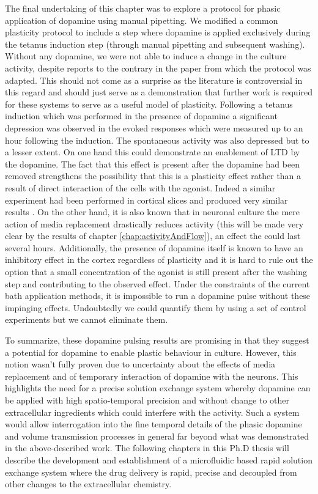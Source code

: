     The final undertaking of this chapter was to explore a protocol for phasic application of dopamine using manual pipetting. We modified a common plasticity protocol to include a step where dopamine is applied exclusively during the tetanus induction step (through manual pipetting and subsequent washing). Without any dopamine, we were not able to induce a change in the culture activity, despite reports to the contrary in the paper from which the protocol was adapted. This should not come as a surprise as the literature is controversial in this regard and should just serve as a demonstration that further work is required for these systems to serve as a useful model of plasticity. Following a tetanus induction which was performed in the presence of dopamine a significant depression was observed in the evoked responses which were measured up to an hour following the induction. The spontaneous activity was also depressed but to a lesser extent. On one hand this could demonstrate an enablement of LTD by the dopamine. The fact that this effect is present after the dopamine had been removed strengthens the possibility that this is a plasticity effect rather than a result of direct interaction of the cells with the agonist. Indeed a similar experiment had been performed in cortical slices and produced very similar results \cite{otani1998dopamine}. On the other hand, it is also known that in neuronal culture the mere action of media replacement drastically reduces activity (this  will be made very clear by the results of chapter \ref{chap:activityAndFlow}), an effect the could last several hours. Additionally, the presence of dopamine itself is known to have an inhibitory effect in the cortex regardless of plasticity \cite{gu2002neuromodulatory,gonzalez2001dopamine} and it is hard to rule out the option that a small concentration of the agonist is still present after the washing step and contributing to the observed effect. Under the constraints of the current bath application methods, it is impossible to run a dopamine pulse without these impinging effects. Undoubtedly we could quantify them by using a set of control experiments but we cannot eliminate them.

    To summarize, these dopamine pulsing results are promising in that they suggest a potential for dopamine to enable plastic behaviour in culture. However, this notion wasn't fully proven due to uncertainty about the effects of media replacement and of temporary interaction of dopamine with the neurons. This highlights the need for a precise solution exchange system whereby dopamine can be applied with high spatio-temporal precision and without change to other extracellular ingredients which could interfere with the activity. Such a system would allow interrogation into the fine temporal details of the phasic dopamine and volume transmission processes in general far beyond what was demonstrated in the above-described work. The following chapters in this Ph.D thesis will describe the development and establishment of a microfluidic based rapid solution exchange system where the drug delivery is rapid, precise and decoupled from other changes to the extracellular chemistry.
